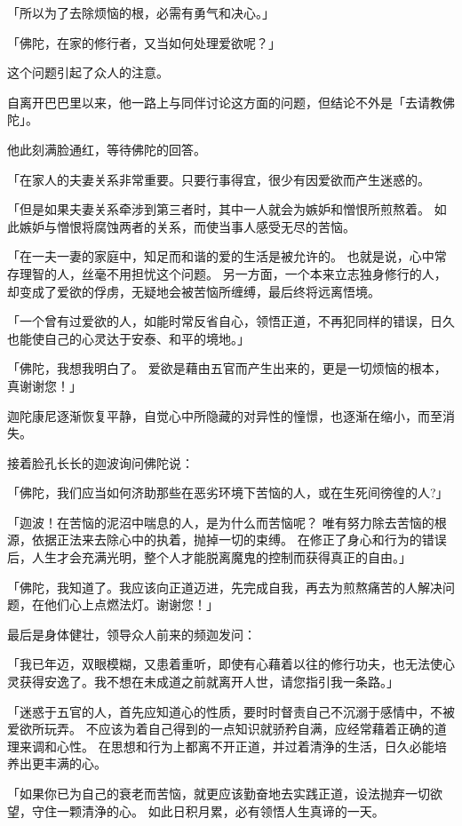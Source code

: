 \documentclass[twoside,openany]{book}
\begin{document}
「所以为了去除烦恼的根，必需有勇气和决心。」

「佛陀，在家的修行者，又当如何处理爱欲呢？」

这个问题引起了众人的注意。

自离开巴巴里以来，他一路上与同伴讨论这方面的问题，但结论不外是「去请教佛陀」。

他此刻满脸通红，等待佛陀的回答。

「在家人的夫妻关系非常重要。只要行事得宜，很少有因爱欲而产生迷惑的。

「但是如果夫妻关系牵涉到第三者时，其中一人就会为嫉妒和憎恨所煎熬着。
如此嫉妒与憎恨将腐蚀两者的关系，而使当事人感受无尽的苦恼。

「在一夫一妻的家庭中，知足而和谐的爱的生活是被允许的。
也就是说，心中常存理智的人，丝毫不用担忧这个问题。
另一方面，一个本来立志独身修行的人，却变成了爱欲的俘虏，无疑地会被苦恼所缠缚，最后终将远离悟境。

「一个曾有过爱欲的人，如能时常反省自心，领悟正道，不再犯同样的错误，日久也能使自己的心灵达于安泰、和平的境地。」

「佛陀，我想我明白了。
爱欲是藉由五官而产生出来的，更是一切烦恼的根本，真谢谢您！」

迦陀康尼逐渐恢复平静，自觉心中所隐藏的对异性的憧憬，也逐渐在缩小，而至消失。

接着脸孔长长的迦波询问佛陀说：

「佛陀，我们应当如何济助那些在恶劣环境下苦恼的人，或在生死间徬徨的人?」

「迦波！在苦恼的泥沼中喘息的人，是为什么而苦恼呢？
唯有努力除去苦恼的根源，依据正法来去除心中的执着，抛掉一切的束缚。
在修正了身心和行为的错误后，人生才会充满光明，整个人才能脱离魔鬼的控制而获得真正的自由。」

「佛陀，我知道了。我应该向正道迈进，先完成自我，再去为煎熬痛苦的人解决问题，在他们心上点燃法灯。谢谢您！」

最后是身体健壮，领导众人前来的频迦发问：

「我已年迈，双眼模糊，又患着重听，即使有心藉着以往的修行功夫，也无法使心灵获得安逸了。我不想在未成道之前就离开人世，请您指引我一条路。」

「迷惑于五官的人，首先应知道心的性质，要时时督责自己不沉溺于感情中，不被爱欲所玩弄。
不应该为着自己得到的一点知识就骄矜自满，应经常藉着正确的道理来调和心性。
在思想和行为上都离不开正道，并过着清浄的生活，日久必能培养出更丰满的心。

「如果你已为自己的衰老而苦恼，就更应该勤奋地去实践正道，设法抛弃一切欲望，守住一颗清浄的心。
如此日积月累，必有领悟人生真谛的一天。
\end{document}
